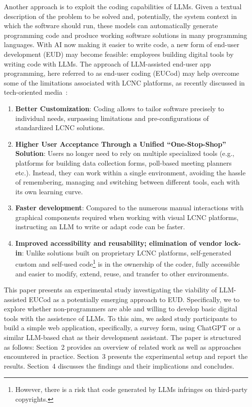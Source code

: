 \documentclass[english,anonymous]{lni}
\begin{document}
Another approach is to exploit the coding capabilities of LLMs. Given a textual description of the problem to be solved and, potentially, the system context in which the software should run, these models can automatically generate programming code and produce working software solutions in many programming languages. 
With AI now making it easier to write code, a new form of end-user development (EUD) may become feasible: employees building digital tools by writing code with  LLMs. The approach of LLM-assisted end-user app programming, here referred to as  end-user coding (EUCod)  may help overcome some of the limitations associated with  LCNC platforms,  as recently discussed in tech-oriented media~\cite{tozzi2024comparison, vanHemert2025nocode, waehner2025generative}: 

\begin{enumerate} 
\item \textbf{Better Customization}:
Coding allows to tailor software precisely to  individual  needs, surpassing  limitations and pre-configurations of standardized LCNC solutions.

\item \textbf{Higher User Acceptance Through a Unified “One-Stop-Shop” Solution}:
Users no longer need to rely on multiple specialized tools (e.g., platforms for building data collection forms, poll-based meeting planners etc.). Instead, they can work within a single environment, avoiding the hassle of remembering,  managing and switching between different tools, each with its own learning curve.

\item \textbf{Faster development}:
Compared to the numerous manual interactions with graphical components required when working with  visual LCNC platforms, instructing  an LLM to write or adapt code can be faster.

\item \textbf{Improved accessibility and reusability; elimination of vendor lock-in}:
Unlike solutions built on proprietary LCNC platforms, self-generated custom and self-used code\footnote{However, there is a risk that code generated by LLMs   infringes on third-party copyrights.} is in the ownership of the coder, fully accessible and easier to modify, extend, reuse, and transfer to other environments.

\end{enumerate}

This paper presents an  experimental study investigating the viability of LLM-assisted EUCod  as a potentially emerging approach to EUD. 
Specifically, we  to explore  whether non-programmers are  able and willing to develop basic digital tools with the assistence of  LLMs. To this aim, we  asked study participants to build a simple web application, specifically, a survey form, using ChatGPT or a similar LLM-based chat as their development assistant.
The paper is structured as follows: Section~2  provides an overview of  related work as well as approaches encountered in practice. Section~3 presents  the experimental setup and report the results. Section~4 discusses the findings and their implications and concludes.
\end{document}
